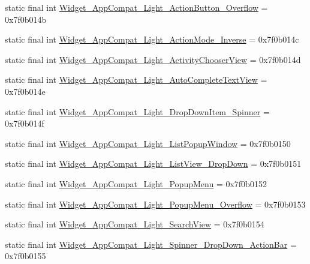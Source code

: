 \begin{CompactItemize}
\item 
static final int \hyperlink{classandroid_1_1support_1_1v7_1_1mediarouter_1_1_r_1_1style_6b4a370cd3c5c0fc1e69bb21b711e549}{Widget\_\-AppCompat\_\-Light\_\-ActionButton\_\-Overflow} = 0x7f0b014b
\item 
static final int \hyperlink{classandroid_1_1support_1_1v7_1_1mediarouter_1_1_r_1_1style_1c1a9b2bf3f2b2ebf56bb20b6601cef6}{Widget\_\-AppCompat\_\-Light\_\-ActionMode\_\-Inverse} = 0x7f0b014c
\item 
static final int \hyperlink{classandroid_1_1support_1_1v7_1_1mediarouter_1_1_r_1_1style_06e567406d43f670501941509ebf2325}{Widget\_\-AppCompat\_\-Light\_\-ActivityChooserView} = 0x7f0b014d
\item 
static final int \hyperlink{classandroid_1_1support_1_1v7_1_1mediarouter_1_1_r_1_1style_d25f0d80886709ea6468319698f09040}{Widget\_\-AppCompat\_\-Light\_\-AutoCompleteTextView} = 0x7f0b014e
\item 
static final int \hyperlink{classandroid_1_1support_1_1v7_1_1mediarouter_1_1_r_1_1style_ee45a1b7fd9d0f47ad38a92c3ecbc39f}{Widget\_\-AppCompat\_\-Light\_\-DropDownItem\_\-Spinner} = 0x7f0b014f
\item 
static final int \hyperlink{classandroid_1_1support_1_1v7_1_1mediarouter_1_1_r_1_1style_185ce1a08a13d0e072634adbbc22fdf7}{Widget\_\-AppCompat\_\-Light\_\-ListPopupWindow} = 0x7f0b0150
\item 
static final int \hyperlink{classandroid_1_1support_1_1v7_1_1mediarouter_1_1_r_1_1style_8746cee9683f220aa564c1a7a2cd7f91}{Widget\_\-AppCompat\_\-Light\_\-ListView\_\-DropDown} = 0x7f0b0151
\item 
static final int \hyperlink{classandroid_1_1support_1_1v7_1_1mediarouter_1_1_r_1_1style_08ca025a6b993825b894b481ab63c2b0}{Widget\_\-AppCompat\_\-Light\_\-PopupMenu} = 0x7f0b0152
\item 
static final int \hyperlink{classandroid_1_1support_1_1v7_1_1mediarouter_1_1_r_1_1style_6291ff8f4a573938d88e00c86c659fc3}{Widget\_\-AppCompat\_\-Light\_\-PopupMenu\_\-Overflow} = 0x7f0b0153
\item 
static final int \hyperlink{classandroid_1_1support_1_1v7_1_1mediarouter_1_1_r_1_1style_67da5dba57d3aff41db14729b8e673b9}{Widget\_\-AppCompat\_\-Light\_\-SearchView} = 0x7f0b0154
\item 
static final int \hyperlink{classandroid_1_1support_1_1v7_1_1mediarouter_1_1_r_1_1style_ae02cd0a959315f74029a5809cedf5aa}{Widget\_\-AppCompat\_\-Light\_\-Spinner\_\-DropDown\_\-ActionBar} = 0x7f0b0155
\item 

\end{CompactItemize}
